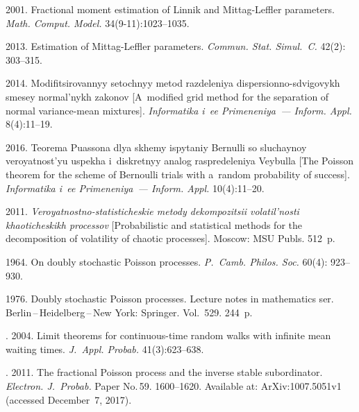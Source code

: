 \begin{multicols}{2}
{{\begin{thebibliography}{99}
 2001. Fractional moment estimation of Linnik
and Mittag-Leffler parameters. \textit{Math. Comput.
Model.} 34(9-11):1023--1035.

 2013. Estimation of Mittag-Leffler parameters.
\textit{Commun. Stat. Simul.~C.}
42(2): 303--315.

 2014. Mo\-di\-fi\-tsi\-ro\-van\-nyy setochnyy metod
razdeleniya dis\-per\-si\-on\-no-sdvi\-go\-vykh smesey normal'nykh zakonov 
[A~modified grid method for the separation of normal variance-mean
mixtures]. \textit{Informatika i~ee Primeneniya~--- Inform. Appl.} 8(4):11--19.

 2016.
Teorema Puassona dlya skhemy ispytaniy Bernulli so sluchaynoy
veroyatnost'yu uspekha i~diskretnyy analog raspredeleniya Veybulla
[The Poisson theorem for the scheme of Bernoulli trials with 
a~random probability of success]. \textit{Informatika i~ee Primeneniya~---
Inform. Appl.} 10(4):11--20.

 2011. \textit{Veroyatnostno-statisticheskie metody
dekompozitsii volatil'nosti khaoticheskikh processov} [Probabilistic
and statistical methods for the decomposition of volatility of
chaotic processes]. Moscow: MSU Publs. 512~p.

 1964. On doubly stochastic Poisson processes. \textit{P.~Camb. 
Philos. Soc.} 60(4): 923--930.

 1976. Doubly stochastic Poisson processes. Lecture notes in
mathematics ser.  Berlin\,--\,Heidelberg\,--\,New York: Springer. Vol.~529. 244~p.

. 2004. Limit theorems for
continuous-time random walks with infinite mean waiting times. \textit{J.~Appl. 
Probab.} 41(3):623--638.

. 
2011. The fractional Poisson process
and the inverse stable subordinator. \textit{Electron. J.~Probab.}
Paper No.\,59. 1600--1620. 
Available at: {\sf ArXiv:1007.5051v1} (accessed December~7, 2017).
\end{thebibliography}

 }
 }

\end{multicols}

